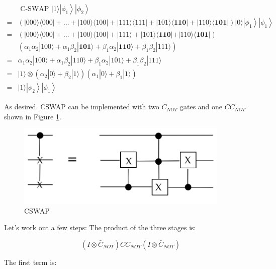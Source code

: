 \documentclass[main.tex]{subfiles}
\begin{document}
    $$
    \begin{aligned}
    & \text { C-SWAP }|1\rangle\left|\phi_{1}\right\rangle\left|\phi_{2}\right\rangle \\
    =&(|000\rangle\langle 000|+\ldots+| 100\rangle\langle 100|+| 111\rangle\langle 111|+| 101\rangle\langle\mathbf{1 1 0}|+| 110\rangle\langle\mathbf{1 0 1}|)|0\rangle\left|\phi_{1}\right\rangle\left|\phi_{1}\right\rangle \\
    =&(|000\rangle\langle 000|+\ldots+| 100\rangle\langle 100|+| 111\rangle+|101\rangle\langle\mathbf{1 1 0}|+| 110\rangle\langle\mathbf{1 0 1}|) \\
    &\left(\alpha_{1} \alpha_{2}|100\rangle+\alpha_{1} \beta_{2}|\mathbf{1 0 1}\rangle+\beta_{1} \alpha_{2}|\mathbf{1 1 0}\rangle+\beta_{1} \beta_{2}|111\rangle\right) \\
    =& \alpha_{1} \alpha_{2}|100\rangle+\alpha_{1} \beta_{2}|110\rangle+\beta_{1} \alpha_{2}|101\rangle+\beta_{1} \beta_{2}|111\rangle \\
    =&|1\rangle \otimes\left(\alpha_{2}|0\rangle+\beta_{2}|1\rangle\right)\left(\alpha_{1}|0\rangle+\beta_{1}|1\rangle\right) \\
    =&|1\rangle\left|\phi_{2}\right\rangle\left|\phi_{1}\right\rangle
    \end{aligned}
    $$
    
    As desired. CSWAP can be implemented with two $C_{NOT}$ gates and one $CC_{NOT}$ shown in Figure \ref{fig:41fredkin2}.
    
    \begin{figure}
        \centering
        \includegraphics[width=4in]{notes/figs/n08/41fredkin2.png}
        \caption{CSWAP}
        \label{fig:41fredkin2}
    \end{figure}
    
    Let's work out a few steps: The product of the three stages is:
    
    $$
    \left(I \otimes \bar{C}_{N O T}\right) C C_{N O T}\left(I \otimes \bar{C}_{N O T}\right)
    $$
    
    The first term is:
    
\end{document}
